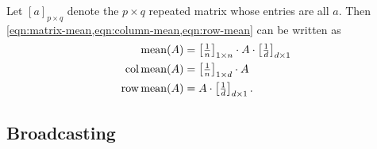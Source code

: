 \def\repmat#1#2{\textstyle\left[#1\right]_{#2}}
Let \([a]_{p \times q}\) denote the \(p \times q\) repeated matrix whose entries are all \(a\).
Then \cref{eqn:matrix-mean,eqn:column-mean,eqn:row-mean} can be written as
\begin{align}
    \mean(A) &= \repmat{\frac{1}{n}}{1 \times n} \cdot A \cdot \repmat{\frac{1}{d}}{d \times 1}\\
    \colmean(A) &= \repmat{\frac{1}{n}}{1 \times d} \cdot A \\
    \rowmean(A) &= A \cdot \repmat{\frac{1}{d}}{d \times 1}.
\end{align}


\subsection{Broadcasting}
\label{subsec:broadcasting}

